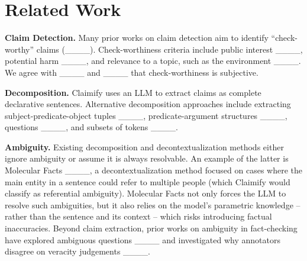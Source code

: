 \section{Related Work}
\label{sec:related_work}

\textbf{Claim Detection.} Many prior works on claim detection aim to identify ``check-worthy'' claims (____). Check-worthiness criteria include public interest ____, potential harm ____, and relevance to a topic, such as the environment ____. We agree with ____ and ____ that check-worthiness is subjective.

\noindent\textbf{Decomposition.} Claimify uses an LLM to extract claims as complete declarative sentences. Alternative decomposition approaches include extracting subject-predicate-object tuples ____, predicate-argument structures ____, questions ____, and subsets of tokens ____.

\noindent\textbf{Ambiguity.} Existing decomposition and decontextualization methods either ignore ambiguity or assume it is always resolvable. An example of the latter is Molecular Facts ____, a decontextualization method focused on cases where the main entity in a sentence could refer to multiple people (which Claimify would classify as referential ambiguity). Molecular Facts not only forces the LLM to resolve such ambiguities, but it also relies on the model’s parametric knowledge – rather than the sentence and its context – which risks introducing factual inaccuracies. Beyond claim extraction, prior works on ambiguity in fact-checking have explored ambiguous questions ____ and investigated why annotators disagree on veracity judgements ____.